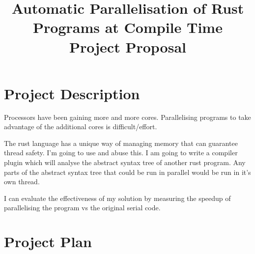 \documentclass[12pt, a4paper]{article}
\title{
	\vspace{-4ex}
	\LARGE\textbf{Automatic Parallelisation of Rust Programs at Compile Time} \\
	\large\textbf{Project Proposal}
	\vspace{-9ex}
}
\date{}
\begin{document}
\maketitle

\section{Project Description}
Processors have been gaining more and more cores. Parallelising programs to take advantage of the additional cores is difficult/effort.

The rust language has a unique way of managing memory that can guarantee thread safety. I'm going to use and abuse this. I am going to write a compiler plugin which will analyse the abstract syntax tree of another rust program. Any parts of the abstract syntax tree that could be run in parallel would be run in it's own thread.

I can evaluate the effectiveness of my solution by measuring the speedup of parallelising the program vs the original serial code.

\section{Project Plan}
\end{document}
